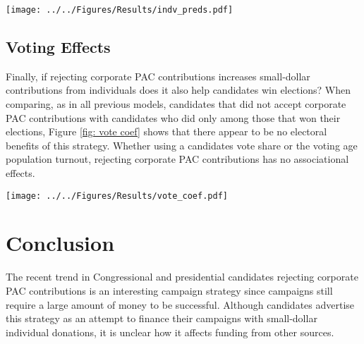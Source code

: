 \documentclass[12pt]{article}
\begin{document}
\begin{figure*}[!htb]
	\centering
	\texttt{[image: ../../Figures/Results/indv\_preds.pdf]}
	\caption{\textbf{Total Predicted Contributions from Individuals by Candidate Type.} This figure shows that candidates who pledge to reject PAC contributions are predicted to received more contributions from individuals affiliated with ideological and business interests, as well as contributions less than and greater than \$200.}
	\label{fig: indiv preds}
\end{figure*}


\subsection{Voting Effects}

Finally, if rejecting corporate PAC contributions increases small-dollar contributions from individuals does it also help candidates win elections? When comparing, as in all previous models, candidates that did not accept corporate PAC contributions with candidates who did only among those that won their elections, Figure \ref{fig: vote coef} shows that there appear to be no electoral benefits of this strategy. Whether using a candidates vote share or the voting age population turnout, rejecting corporate PAC contributions has no associational effects. 

\begin{figure*}[!htb]
	\center
	\texttt{[image: ../../Figures/Results/vote\_coef.pdf]}
	\caption{\textbf{The Effect of Rejecting Corporate PAC Contributions on Vote Share and Turnout.} These figures present the posterior distributions estimated for a candidate that pledges to reject corporate PAC contributions. The dot shows the median coefficient estimate and the intervals show the 50\% and 89\% highest density intervals. This figure shows that rejecting corporate PAC contributions has no effect on a candidate's vote percentage or turnout. See Table \ref{tbl: vote results} for the formal estimates.}
    \label{fig: vote coef}
\end{figure*}


\section{Conclusion} \label{sec: conclusion}

The recent trend in Congressional and presidential candidates rejecting corporate PAC contributions is an interesting campaign strategy since campaigns still require a large amount of money to be successful. Although candidates advertise this strategy as an attempt to finance their campaigns with small-dollar individual donations, it is unclear how it affects funding from other sources. 
\end{document}
